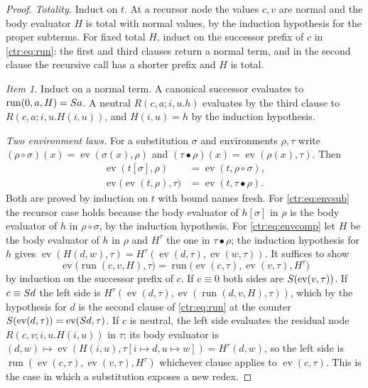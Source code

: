 \begin{proof}
\emph{Totality.} Induct on $t$. At a recursor node the values $c,v$ are normal and the body
evaluator $H$ is total with normal values, by the induction hypothesis for the proper
subterms. For fixed total $H$, induct on the successor prefix of $c$ in
\eqref{ctr:eq:run}: the first and third clauses return a normal term, and in the second
clause the recursive call has a shorter prefix and $H$ is total.

\emph{Item 1.} Induct on a normal term. A canonical successor evaluates to
$\operatorname{run}(0,a,H)=S a$. A neutral $R(c,a;i,u.h)$ evaluates by the third clause to
$R(c,a;i,u.H(i,u))$, and $H(i,u)=h$ by the induction hypothesis.

\emph{Two environment laws.} For a substitution $\sigma$ and environments $\rho,\tau$ write
$(\rho\circ\sigma)(x)=\operatorname{ev}(\sigma(x),\rho)$ and
$(\tau\bullet\rho)(x)=\operatorname{ev}(\rho(x),\tau)$. Then
\begin{align}
 \operatorname{ev}(t[\sigma],\rho)&=\operatorname{ev}(t,\rho\circ\sigma),
 \label{ctr:eq:envsub}\\
 \operatorname{ev}\bigl(\operatorname{ev}(t,\rho),\tau\bigr)&=\operatorname{ev}(t,\tau\bullet\rho).
 \label{ctr:eq:envcomp}
\end{align}
Both are proved by induction on $t$ with bound names fresh. For \eqref{ctr:eq:envsub} the
recursor case holds because the body evaluator of $h[\sigma]$ in $\rho$ is the body evaluator
of $h$ in $\rho\circ\sigma$, by the induction hypothesis. For \eqref{ctr:eq:envcomp} let
$H$ be the body evaluator of $h$ in $\rho$ and $H^\tau$ the one in $\tau\bullet\rho$; the
induction hypothesis for $h$ gives
$\operatorname{ev}(H(d,w),\tau)=H^\tau(\operatorname{ev}(d,\tau),\operatorname{ev}(w,\tau))$.
It suffices to show
\[
 \operatorname{ev}\bigl(\operatorname{run}(c,v,H),\tau\bigr)
 =\operatorname{run}\bigl(\operatorname{ev}(c,\tau),\operatorname{ev}(v,\tau),H^\tau\bigr)
\]
by induction on the successor prefix of $c$. If $c\equiv 0$ both sides are
$S(\operatorname{ev}(v,\tau))$. If $c\equiv S d$ the left side is
$H^\tau(\operatorname{ev}(d,\tau),\operatorname{ev}(\operatorname{run}(d,v,H),\tau))$, which
by the hypothesis for $d$ is the second clause of \eqref{ctr:eq:run} at the counter
$S(\operatorname{ev}(d,\tau))=\operatorname{ev}(S d,\tau)$. If $c$ is neutral, the left
side evaluates the residual node $R(c,v;i,u.H(i,u))$ in $\tau$; its body evaluator is
$(d,w)\mapsto\operatorname{ev}(H(i,u),\tau[i\mapsto d,u\mapsto w])=H^\tau(d,w)$, so the left
side is $\operatorname{run}(\operatorname{ev}(c,\tau),\operatorname{ev}(v,\tau),H^\tau)$
whichever clause applies to $\operatorname{ev}(c,\tau)$. This is the case in which a
substitution exposes a new redex.


\end{proof}
